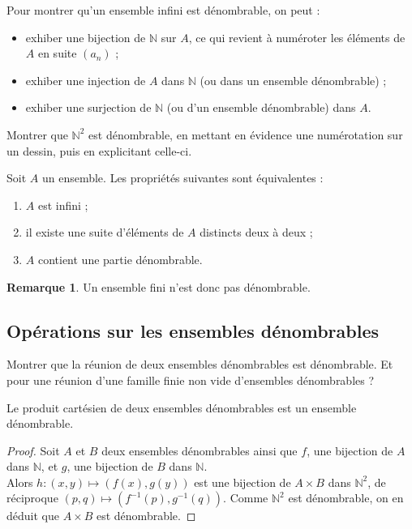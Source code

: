 \documentclass[french]{article}
\newcommand{\N}{\mathbb{N}}
\newcommand{\inv}{^{-1}}
\theoremstyle{plain}
\theoremstyle{definition}
\newtheorem*{rmq}{Remarque}
\theoremstyle{remark}
\begin{document}
\begin{met}
	Pour montrer qu'un ensemble infini est dénombrable, on peut :
	\begin{itemize}
		\item exhiber une bijection de $\N$ sur $A$, ce qui revient à numéroter les éléments de $A$ en suite $(a_n)$ ;
		\item exhiber une injection de $A$ dans $\N$ (ou dans un ensemble dénombrable) ;
		\item exhiber une surjection de $\N$ (ou d'un ensemble dénombrable) dans $A$.
	\end{itemize}
\end{met}

\begin{exo}
	Montrer que $\N^2$ est dénombrable, en mettant en évidence une numérotation sur un dessin, puis en explicitant celle-ci.
\end{exo}

\begin{prop}%
	Soit $A$ un ensemble. Les propriétés suivantes sont équivalentes :
	\begin{enumerate}[label=(\roman*)]
		\item $A$ est infini ;
		\item il existe une suite d'éléments de $A$ distincts deux à deux ;
		\item $A$ contient une partie dénombrable.
	\end{enumerate}
\end{prop}

\begin{rmq}
	Un ensemble fini n'est donc pas dénombrable.
\end{rmq}

\subsection{Opérations sur les ensembles dénombrables}

\begin{exo}
	Montrer que la réunion de deux ensembles dénombrables est dénombrable. Et pour une réunion d'une famille finie non vide d'ensembles dénombrables ?
\end{exo}

\begin{prop}%
	Le produit cartésien de deux ensembles dénombrables est un ensemble dénombrable.
\end{prop}
\begin{proof}
	Soit $A$ et $B$ deux ensembles dénombrables ainsi que $f$, une bijection de $A$ dans $\N$, et $g$, une bijection de $B$ dans $\N$. \\
	Alors $h:(x,y)\mapsto(f(x),g(y))$ est une bijection de $A\times B$ dans $\N^2$, de réciproque $(p,q)\mapsto(f\inv(p),g\inv(q))$. Comme $\N^2$ est dénombrable, on en déduit que $A\times B$ est dénombrable.
\end{proof}
\end{document}
